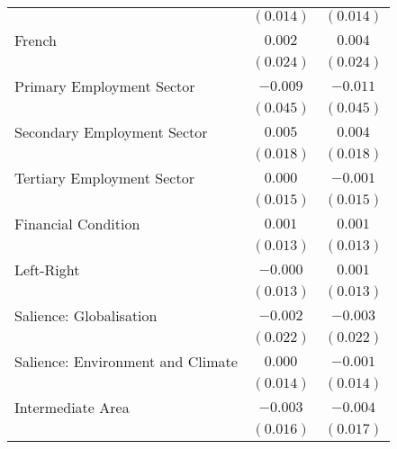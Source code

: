 \begin{center}
\begin{tiny}
\begin{longtable}{l@{} c@{} c@{}}
                                                         & $(0.014)$        & $(0.014)$        \\
\quad French                                             & $0.002$          & $0.004$          \\
                                                         & $(0.024)$        & $(0.024)$        \\
\quad Primary Employment Sector                          & $-0.009$         & $-0.011$         \\
                                                         & $(0.045)$        & $(0.045)$        \\
\quad Secondary Employment Sector                        & $0.005$          & $0.004$          \\
                                                         & $(0.018)$        & $(0.018)$        \\
\quad Tertiary Employment Sector                         & $0.000$          & $-0.001$         \\
                                                         & $(0.015)$        & $(0.015)$        \\
\quad Financial Condition                                & $0.001$          & $0.001$          \\
                                                         & $(0.013)$        & $(0.013)$        \\
\quad Left-Right                                         & $-0.000$         & $0.001$          \\
                                                         & $(0.013)$        & $(0.013)$        \\
\quad Salience: Globalisation                            & $-0.002$         & $-0.003$         \\
                                                         & $(0.022)$        & $(0.022)$        \\
\quad Salience: Environment and Climate                  & $0.000$          & $-0.001$         \\
                                                         & $(0.014)$        & $(0.014)$        \\
Intermediate Area                                        & $-0.003$         & $-0.004$         \\
                                                         & $(0.016)$        & $(0.017)$        \\

\end{longtable}
\end{tiny}
\end{center}
